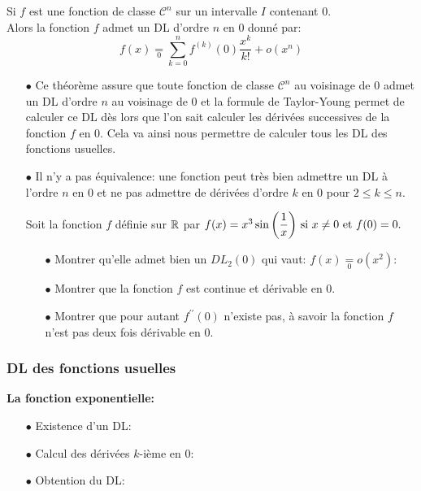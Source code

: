 \documentclass[a4paper, 11pt]{article}
\begin{document}
{ {\noindent  

\begin{theorem} 
Si $f$ est une fonction de classe $\mathcal{C}^n$ sur un intervalle $I$ contenant 0.\\
Alors la fonction $f$ admet un DL d'ordre $n$ en 0 donn\'e par:
 $$
f(x)  \underset{0}{=} \sum_{k=0}^n f^{(k)}(0)\frac{x^k}{k!} +o(x^n) 
$$
\end{theorem}
 
}

 
\begin{rems}
\begin{itemize}
\item[$\bullet$] Ce th\'eor\`eme assure que toute fonction de classe $\mathcal{C}^n$ au voisinage de 0 admet un DL d'ordre $n$ au voisinage de 0 et la formule de Taylor-Young permet de calculer ce DL d\`es lors que l'on sait calculer les d\'eriv\'ees successives de la fonction $f$ en 0. Cela va ainsi nous permettre de calculer tous les DL des fonctions usuelles.\\
\item[$\bullet$]  \warning  Il n'y a pas \'equivalence: une fonction peut tr\`es bien admettre un DL \`a l'ordre $n$ en 0 et ne pas admettre de d\'eriv\'ees d'ordre $k$ en 0 pour $2\leq k\leq n$.
\begin{exemple}
Soit la fonction $f$ d\'efinie sur $\mathbb{R}$ par $f(x)=x^3\sin{\left(  \ddp\frac{1}{x}\right)}\ \hbox{si}\ x\not= 0\ \hbox{et}\ f(0)=0.$
\begin{itemize}
\item[$\bullet$] Montrer qu'elle admet bien un $DL_2(0)$ qui vaut: $f(x)\underset{0}{=} o(x^2)$:
\item[$\bullet$] Montrer que la fonction $f$ est continue et d\'erivable en 0.

\item[$\bullet$] Montrer que pour autant $f^{\prime\prime}(0)$ n'existe pas, \`{a} savoir la fonction $f$ n'est pas deux fois d\'erivable en 0.
\end{itemize}
\end{exemple}
\end{itemize}
\end{rems}\vsec


\subsubsection{DL des fonctions usuelles}

 \textbf{\large{La fonction exponentielle:}}\vsec
 \begin{itemize}
 \item[$\bullet$] Existence d'un DL:\dotfill
 \item[$\bullet$] Calcul des d\'eriv\'ees $k$-i\`{e}me en 0: \dotfill 
 \item[$\bullet$] Obtention du DL: \vsec\\




\end{itemize}}
\end{document}
